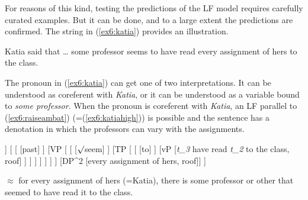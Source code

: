 For reasons of this kind, testing the predictions of the LF model requires carefully curated examples. But it can be done, and to a large extent the predictions are confirmed. The string in (\ref{ex6:katia}) provides an illustration.
\begin{exe}
\raggedright
	\sn Katia said that \ldots
	\ex \label{ex6:katia}
	some professor seems to have read every assignment of hers to the class.
\end{exe}
The pronoun in (\ref{ex6:katia}) can get one of two interpretations. It can be understood as coreferent with \emph{Katia}, or it can be understood as a variable bound to \emph{some professor}. %
%
%
%
When the pronoun is coreferent with \emph{Katia}, an LF parallel to (\ref{ex6:raiseambat}) (=(\ref{ex6:katiahigh})) is possible and the sentence has a denotation in which the professors can vary with the assignments.
\begin{exe}
\raggedright
	\ex \label{ex6:katiahigh}
	\footnotesize
	\begin{forest}
	[TP
		[TP
			[DP^3 [some professor, roof]]
			[
				[ [past] ]
				[VP [
					[ ]
					[TP [
						[ [to] ]
						[vP [\emph{t_3} have read \emph{t_2} to the class, roof] ]
					] ]
				] ]
			 ]
		]	
		[DP^2 [every assignment of hers, roof]]
	]
	\end{forest}
	\sn $\approx$ for every assignment of hers (=Katia), there is some professor or other that seemed to have read it to the class.
\end{exe}
